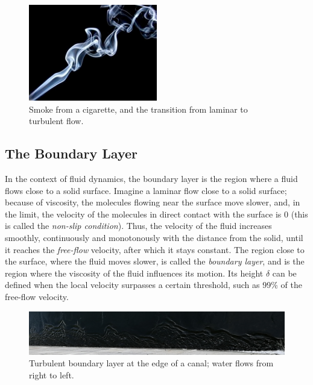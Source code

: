 \documentclass[12pt]{book}
\begin{document}
\begin{figure}
\caption{Smoke from a cigarette, and the transition from laminar to turbulent flow.}
\label{fig:smoke}
\centering
\includegraphics[width=0.5\textwidth]{images/smoke}
\end{figure}


\subsection{The Boundary Layer}
In the context of fluid dynamics, the boundary layer is the region where a fluid flows close to a solid surface. Imagine a laminar flow close to a solid surface; because of viscosity, the molecules flowing near the surface move slower, and, in the limit, the velocity of the molecules in direct contact with the surface is 0 (this is called the \emph{non-slip condition}). Thus, the velocity of the fluid increases smoothly, continuously and monotonously with the distance from the solid, until it reaches the \emph{free-flow} velocity, after which it stays constant. The region close to the surface, where the fluid moves slower, is called the \emph{boundary layer}, and is the region where the viscosity of the fluid influences its motion. Its height $\delta$ can be defined when the local velocity surpasses a certain threshold, such as 99\% of the free-flow velocity.

\begin{figure}
\caption{Turbulent boundary layer at the edge of a canal; water flows from right to left.}
\label{fig:bl}
\centering
\includegraphics[width=\textwidth]{images/bl}
\end{figure}
\end{document}
